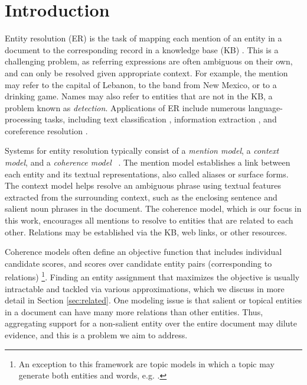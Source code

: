 \section{Introduction}
\label{sec:intro}

Entity resolution (ER) is the task of mapping each mention of an entity in a document to the corresponding record in a knowledge base (KB) \cite{BunescuP06,Cucerzan07,KulkarniSRC09,Dredze2010,Hoffart2011,Hachey2013130}.  
This is a challenging problem, as referring expressions are often ambiguous on their own, and can only be resolved given appropriate context. For example, the mention  may refer to the capital of Lebanon, to the band from New Mexico, or to a drinking game. Names may also refer to entities that are not in the KB, a problem known as \emph{{\NIL} detection}. 
Applications of ER include numerous language-processing tasks, including text classification \cite{Gabrilovich2007}, information extraction \cite{Lin2012}, and coreference resolution \cite{finin2009Coreference,mayfield2009cross}. 

Systems for entity resolution typically consist of a \emph{mention model}, a \emph{context model}, and a \emph{coherence model}~\cite{Milne2008,Cucerzan07,Ratinov11,Hoffart2011,Hachey2013130} .  The mention model establishes a link between each entity and its textual representations, also called aliases or surface forms. The context model helps resolve an ambiguous phrase using textual features extracted from the surrounding context, such as the enclosing sentence and salient noun phrases in the document. The coherence model, which is our focus in this work, encourages all mentions to resolve to entities that are related to each other. Relations may be established via the KB, web links, or other resources. 

Coherence models often define an objective function that includes individual candidate scores, and scores over candidate entity pairs (corresponding to relations)
\footnote{An exception to this framework are topic models in which a topic may generate both entities and words, e.g. \cite{kataria2011,HanS12,houlsby2014scalable}.}. Finding an entity assignment that maximizes the objective is usually intractable and tackled via various approximations, which we discuss in more detail in Section \ref{sec:related}. One modeling issue is that salient or topical entities in a document can have many more relations than other entities. Thus, aggregating support for a non-salient entity over the entire document may dilute evidence, and this is a problem we aim to address.

